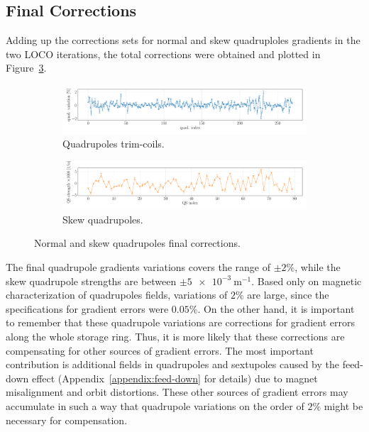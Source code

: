 \subsection{Final Corrections}
Adding up the corrections sets for normal and skew quadruploles gradients in the two LOCO iterations, the total corrections were obtained and plotted in Figure~\ref{fig:loco_corrections_final}.
\begin{figure}
\centering
\begin{subfigure}[t]{1.0\textwidth}
\includegraphics[width=1.0\textwidth]{figures/loco_quad_corrections_errorbar_big.pdf}
    \caption{Quadrupoles trim-coils.}
    \label{subfig:quad_fit_final}
\end{subfigure}
 \begin{subfigure}[t]{1.0\textwidth}
\includegraphics[width=1.0\textwidth]{figures/loco_qs_corrections_errorbar_big.pdf}
    \caption{Skew quadrupoles.}
    \label{subfig:qs_fit_final}
\end{subfigure}
\caption{Normal and skew quadrupoles final corrections.}
\label{fig:loco_corrections_final}
\end{figure}

The final quadrupole gradients variations covers the range of $\pm 2\%$, while the skew quadrupole strengths are between $\pm \SI{5e-3}{\meter^{-1}}$. Based only on magnetic characterization of quadrupoles fields, variations of $2\%$ are large, since the specifications for gradient errors were $0.05\%$. On the other hand, it is important to remember that these quadrupole variations are corrections for gradient errors along the whole storage ring. Thus, it is more likely that these corrections are compensating for other sources of gradient errors. The most important contribution is additional fields in quadrupoles and sextupoles caused by the feed-down effect (Appendix~\ref{appendix:feed-down} for details) due to magnet misalignment and orbit distortions. These other sources of gradient errors may accumulate in such a way that quadrupole variations on the order of $2\%$ might be necessary for compensation.

